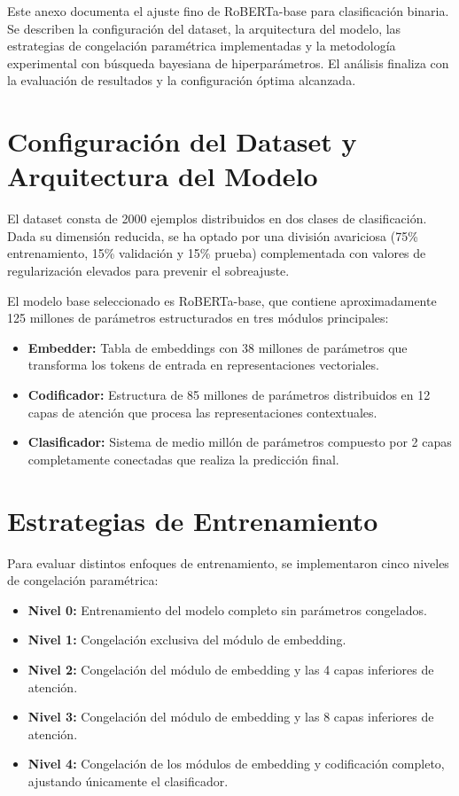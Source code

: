 \label{anexo:entrenamiento}
Este anexo documenta el ajuste fino de RoBERTa-base para clasificación binaria. Se describen la configuración del dataset, la arquitectura del modelo, las estrategias de congelación paramétrica implementadas y la metodología experimental con búsqueda bayesiana de hiperparámetros. El análisis finaliza con la evaluación de resultados y la configuración óptima alcanzada.

\section{Configuración del Dataset y Arquitectura del Modelo}

El dataset consta de 2000 ejemplos distribuidos en dos clases de clasificación. Dada su dimensión reducida, se ha optado por una división avariciosa (75\% entrenamiento, 15\% validación y 15\% prueba) complementada con valores de regularización elevados para prevenir el sobreajuste.

El modelo base seleccionado es RoBERTa-base, que contiene aproximadamente 125 millones de parámetros estructurados en tres módulos principales:

\begin{itemize}
  \item \textbf{Embedder:} Tabla de embeddings con 38 millones de parámetros que transforma los tokens de entrada en representaciones vectoriales.
  \item \textbf{Codificador:} Estructura de 85 millones de parámetros distribuidos en 12 capas de atención que procesa las representaciones contextuales.
  \item \textbf{Clasificador:} Sistema de medio millón de parámetros compuesto por 2 capas completamente conectadas que realiza la predicción final. 
\end{itemize}

\section{Estrategias de Entrenamiento}

Para evaluar distintos enfoques de entrenamiento, se implementaron cinco niveles de congelación paramétrica:

\begin{itemize}
  \item \textbf{Nivel 0:} Entrenamiento del modelo completo sin parámetros congelados.
  \item \textbf{Nivel 1:} Congelación exclusiva del módulo de embedding.
  \item \textbf{Nivel 2:} Congelación del módulo de embedding y las 4 capas inferiores de atención.
  \item \textbf{Nivel 3:} Congelación del módulo de embedding y las 8 capas inferiores de atención.
  \item \textbf{Nivel 4:} Congelación de los módulos de embedding y codificación completo, ajustando únicamente el clasificador. 
\end{itemize}

